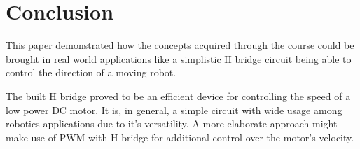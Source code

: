\section{\textbf{Conclusion}}\label{sec:6}
This paper demonstrated how the concepts acquired through the course could be brought in real world applications like a simplistic H bridge circuit being able to control the direction of a moving robot.

The built H bridge proved to be an efficient device for controlling the speed of a low power DC motor. It is, in general, a simple circuit with wide usage among robotics applications due to it's versatility. A more elaborate approach might make use of PWM with H bridge for additional control over the motor's velocity.
